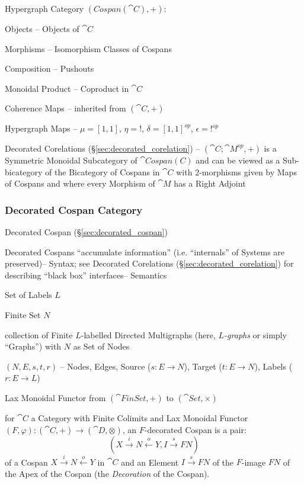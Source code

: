 Hypergraph Category $(Cospan(\cat{C}), +)$:

Objects -- Objects of $\cat{C}$

Morphisms -- Isomorphism Classes of Cospans

Composition -- Pushouts

Monoidal Product -- Coproduct in $\cat{C}$

Coherence Maps -- inherited from $(\cat{C}, +)$

Hypergraph Maps -- $\mu = [1,1]$, $\eta = !$, $\delta = [1,1]^{op}$,
$\epsilon = !^{op}$

Decorated Corelations (\S\ref{sec:decorated_corelation}) --
$(\cat{C};\cat{M}^{op}, +)$ is a Symmetric Monoidal Subcategory of
$\cat{Cospan(C)}$ and can be viewed as a Sub-bicategory of the
Bicategory of Cospans in $\cat{C}$ with $2$-morphisms given by Maps of
Cospans and where every Morphism of $\cat{M}$ has a Right Adjoint



\subsubsection{Decorated Cospan Category}
\label{sec:decorated_cospan_category}

Decorated Cospan (\S\ref{sec:decorated_cospan})

Decorated Cospans ``accumulate information'' (i.e. ``internals'' of
Systems are preserved)-- Syntax; see Decorated Corelations
(\S\ref{sec:decorated_corelation}) for describing ``black box''
interfaces-- Semantics

Set of Labels $L$

Finite Set $N$

collection of Finite $L$-labelled Directed Multigraphs (here,
\emph{$L$-graphs} or simply ``Graphs'') with $N$ as Set of Nodes

$(N,E,s,t,r)$ -- Nodes, Edges, Source ($s : E \rightarrow N$), Target
($t : E \rightarrow N$), Labels ($r : E \rightarrow L$)

Lax Monoidal Functor from $(\cat{FinSet},+)$ to $(\cat{Set}, \times)$


for $\cat{C}$ a Category with Finite Colimits and Lax Monoidal Functor
$(F, \varphi) : (\cat{C}, +) \rightarrow (\cat{D}, \otimes)$, an
$F$-decorated Cospan is a pair:
\[
  (X \xrightarrow{i} N \xleftarrow{o} Y, I \xrightarrow{s} F N)
\]
of a Cospan $X \xrightarrow{i} N \xleftarrow{o} Y$ in $\cat{C}$ and an
Element $I \xrightarrow{s} F N$ of the $F$-image $F N$ of the Apex of
the Cospan (the \emph{Decoration} of the Cospan).

